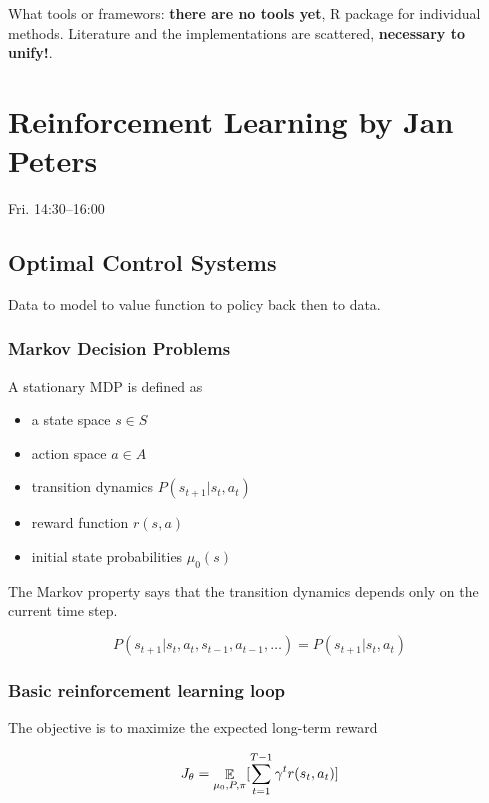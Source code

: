 \documentclass[b5paper]{report}
\begin{document}
What tools or framewors: \textbf{there are no tools yet}, R package for
individual methods. Literature and the implementations are scattered,
\textbf{necessary to unify!}.

\chapter{Reinforcement Learning by Jan Peters}

Fri. 14:30--16:00

\section{Optimal Control Systems}

Data to model to value function to policy back then to data.

\subsection{Markov Decision Problems}

A stationary MDP is defined as

\begin{itemize}
  \item a state space $s \in S$
  \item action space $a \in A$
  \item transition dynamics $P(s_{t+1}| s_t, a_t)$
  \item reward function $r(s,a)$
  \item initial state probabilities $\mu_0(s)$
\end{itemize}

The Markov property says that the transition dynamics depends only on the
current time step.

\begin{equation}
  P(s_{t+1}|s_t, a_t, s_{t-1}, a_{t-1}, \dots) = P(s_{t+1}|s_t, a_t)
\end{equation}


\subsection{Basic reinforcement learning loop}

The objective is to maximize the expected long-term reward

\begin{equation}
  J_\theta = \operatorname*{\mathbb{\mathop{E}}}_{\mu_0, P, \pi} [\sum_{t=1}^{T-1}\gamma^t r(s_t, a_t)]
\end{equation}
\end{document}
